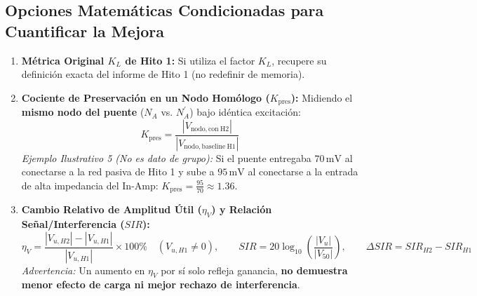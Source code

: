 \documentclass[10pt, a4paper]{article}
\begin{document}
\begin{center}
\end{center}

\subsection*{Opciones Matemáticas Condicionadas para Cuantificar la Mejora}
\begin{enumerate}
    \setlength{\itemsep}{1pt}
    \item \textbf{Métrica Original $K_L$ de Hito 1:} Si utiliza el factor $K_L$, recupere su definición exacta del informe de Hito 1 (no redefinir de memoria).
    \item \textbf{Cociente de Preservación en un Nodo Homólogo ($K_{\mathrm{pres}}$):} Midiendo el \textbf{mismo nodo del puente} ($N_A$ vs. $N_A^\prime$) bajo idéntica excitación:
    \begin{equation}
        \boxed{K_{\mathrm{pres}} = \frac{|V_{\mathrm{nodo,con\ H2}}|}{|V_{\mathrm{nodo,baseline\ H1}}|}}
    \end{equation}
    \textit{Ejemplo Ilustrativo 5 (No es dato de grupo):} Si el puente entregaba $70\,\text{mV}$ al conectarse a la red pasiva de Hito 1 y sube a $95\,\text{mV}$ al conectarse a la entrada de alta impedancia del In-Amp: $K_{\mathrm{pres}} = \frac{95}{70} \approx 1.36$.
    \item \textbf{Cambio Relativo de Amplitud Útil ($\eta_V$) y Relación Señal/Interferencia ($SIR$):}
    \begin{equation}
        \eta_V = \frac{|V_{u,H2}| - |V_{u,H1}|}{|V_{u,H1}|}\times 100\% \quad (V_{u,H1}\neq 0), \qquad SIR = 20\log_{10}\left(\frac{|V_u|}{|V_{50}|}\right), \qquad \boxed{\Delta SIR = SIR_{H2} - SIR_{H1}}
    \end{equation}
    \textit{Advertencia:} Un aumento en $\eta_V$ por sí solo refleja ganancia, \textbf{no demuestra menor efecto de carga ni mejor rechazo de interferencia}.
\end{enumerate}
\end{document}
